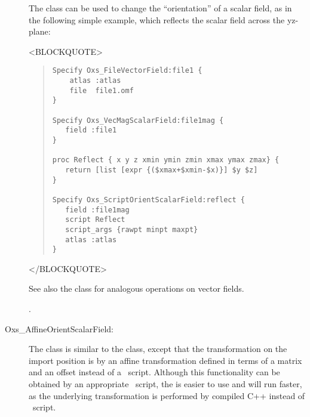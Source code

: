 \begin{description}
The  class can be used to change the
``orientation'' of a scalar field, as in the following simple example,
which reflects the  scalar field across the yz-plane:
\begin{rawhtml}
<BLOCKQUOTE>
\end{rawhtml}
\begin{quote}
\begin{verbatim}
Specify Oxs_FileVectorField:file1 {
    atlas :atlas
    file  file1.omf
}

Specify Oxs_VecMagScalarField:file1mag {
   field :file1
}

proc Reflect { x y z xmin ymin zmin xmax ymax zmax} {
   return [list [expr {($xmax+$xmin-$x)}] $y $z]
}

Specify Oxs_ScriptOrientScalarField:reflect {
   field :file1mag
   script Reflect
   script_args {rawpt minpt maxpt}
   atlas :atlas
}
\end{verbatim}
\end{quote}
\begin{rawhtml}
</BLOCKQUOTE>
\end{rawhtml}
See also the
class for
analogous operations on vector fields.

\begin{ExampleMifs}[Example]
  .
\end{ExampleMifs}

\item[Oxs\_AffineOrientScalarField:\label{item:AffineOrientScalarField}]
%
The  class is similar to the
 class, except that the transformation
on the import position is by an affine transformation defined in terms
of a  matrix and an offset instead of a
\Tcl\ script.  Although this functionality can be obtained by an
appropriate \Tcl\ script, the  is
easier to use and will run faster, as the underlying transformation is
performed by compiled C++ instead of \Tcl\ script.


\end{description}
